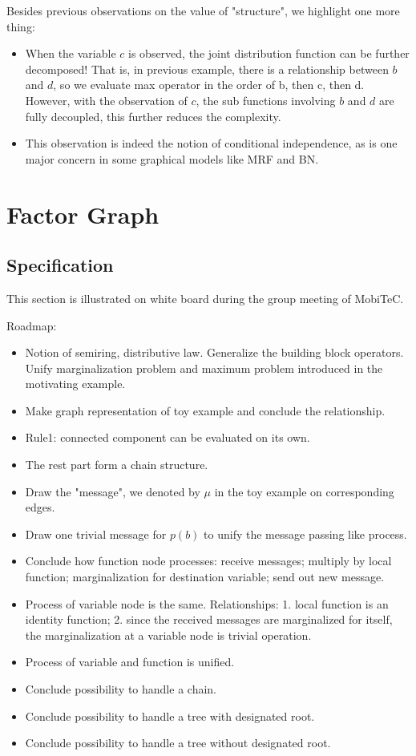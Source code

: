 \documentclass[11pt,a4paper]{article}
\begin{document}
Besides previous observations on the value of "structure", we 
highlight one more thing:
\begin{itemize}
	\item When the variable $c$ is observed, the joint distribution 
	function can be further decomposed! That is, in previous example, 
	there is a relationship between $b$ and $d$, so we evaluate max operator
	in the order of b, then c, then d. However, with the observation 
	of $c$, the sub functions involving $b$ and $d$ are fully 
	decoupled, this further reduces the complexity. 
	\item This observation is indeed the notion of 
	conditional independence, as is one major concern in 
	some graphical models like MRF and BN. 
\end{itemize}

\section{Factor Graph}

\subsection{Specification}

This section is illustrated on white board during the 
group meeting of MobiTeC. 

Roadmap:
\begin{itemize}
	\item Notion of semiring, distributive law. 
	Generalize the building block operators.
	Unify marginalization problem and maximum problem 
	introduced in the motivating example.  
	\item Make graph representation of toy example and
	conclude the relationship. 
	\item Rule1: connected component can be evaluated 
	on its own. 
	\item The rest part form a chain structure. 
	\item Draw the "message", we denoted by $\mu$ in the toy 
	example on corresponding edges.
	\item Draw one trivial message for $p(b)$ to unify the message 
	passing like process. 
	\item Conclude how function node processes: receive messages;
	multiply by local function; marginalization for destination 
	variable; send out new message. 
	\item Process of variable node is the same. Relationships:
	1. local function is an identity function; 2. since the received
	messages are marginalized for itself, the marginalization at 
	a variable node is trivial operation. 
	\item Process of variable and function is unified. 
	\item Conclude possibility to handle a chain. 
	\item Conclude possibility to handle a tree with designated root. 
	\item Conclude possibility to handle a tree without designated root. 
\end{itemize}
\end{document}
